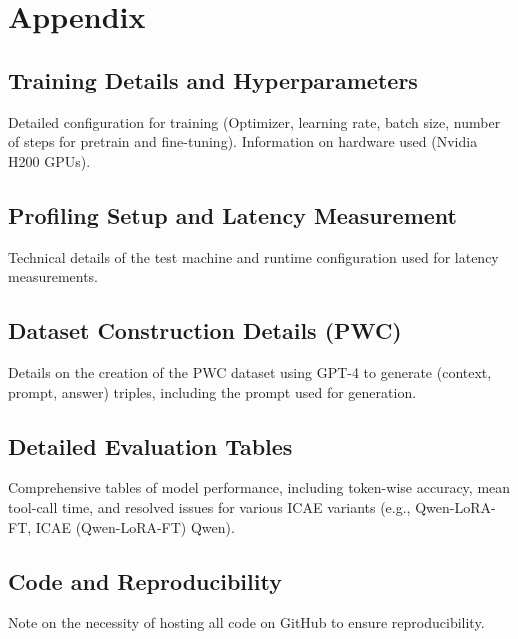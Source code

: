 \appendix
\chapter{Appendix}


\section{Training Details and Hyperparameters}

Detailed configuration for training (Optimizer, learning rate, batch size, number of steps for pretrain and fine-tuning). Information on hardware used (Nvidia H200 GPUs).


\section{Profiling Setup and Latency Measurement}

Technical details of the test machine and runtime configuration used for latency measurements.


\section{Dataset Construction Details (PWC)}

Details on the creation of the PWC dataset using GPT-4 to generate (context, prompt, answer) triples, including the prompt used for generation.


\section{Detailed Evaluation Tables}

Comprehensive tables of model performance, including token-wise accuracy, mean tool-call time, and resolved issues for various ICAE variants (e.g., Qwen-LoRA-FT, ICAE (Qwen-LoRA-FT) Qwen).


\section{Code and Reproducibility}

Note on the necessity of hosting all code on GitHub to ensure reproducibility.
